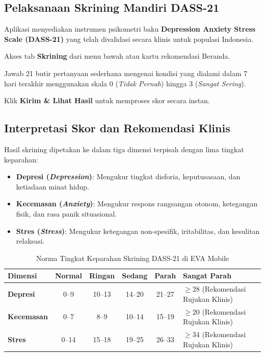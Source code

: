 \subsection{Pelaksanaan Skrining Mandiri DASS-21}
Aplikasi menyediakan instrumen psikometri baku \textbf{Depression Anxiety Stress Scale (DASS-21)} yang telah divalidasi secara klinis untuk populasi Indonesia.
\begin{steplist}
  \item Akses tab \textbf{Skrining} dari menu bawah atau kartu rekomendasi Beranda.
  \item Jawab 21 butir pertanyaan sederhana mengenai kondisi yang dialami dalam 7 hari terakhir menggunakan skala 0 (\textit{Tidak Pernah}) hingga 3 (\textit{Sangat Sering}).
  \item Klik \textbf{Kirim \& Lihat Hasil} untuk memproses skor secara instan.
\end{steplist}

\subsection{Interpretasi Skor dan Rekomendasi Klinis}
Hasil skrining dipetakan ke dalam tiga dimensi terpisah dengan lima tingkat keparahan:
\begin{itemize}[leftmargin=1.4em]
  \item \textbf{Depresi (\textit{Depression})}: Mengukur tingkat disforia, keputusasaan, dan ketiadaan minat hidup.
  \item \textbf{Kecemasan (\textit{Anxiety})}: Mengukur respons rangsangan otonom, ketegangan fisik, dan rasa panik situasional.
  \item \textbf{Stres (\textit{Stress})}: Mengukur ketegangan non-spesifik, iritabilitas, dan kesulitan relaksasi.
\end{itemize}

\begin{table}[htbp]
  \centering
  \caption{Norma Tingkat Keparahan Skrining DASS-21 di EVA Mobile}
  \label{tab:dass-norms}
  \small
  \begin{tabularx}{\textwidth}{@{}lccccX@{}}
    \toprule
    \textbf{Dimensi} & \textbf{Normal} & \textbf{Ringan} & \textbf{Sedang} & \textbf{Parah} & \textbf{Sangat Parah} \\
    \midrule
    \textbf{Depresi} & 0--9 & 10--13 & 14--20 & 21--27 & $\ge 28$ (Rekomendasi Rujukan Klinis) \\
    \textbf{Kecemasan} & 0--7 & 8--9 & 10--14 & 15--19 & $\ge 20$ (Rekomendasi Rujukan Klinis) \\
    \textbf{Stres} & 0--14 & 15--18 & 19--25 & 26--33 & $\ge 34$ (Rekomendasi Rujukan Klinis) \\
    \bottomrule
  \end{tabularx}
\end{table}

